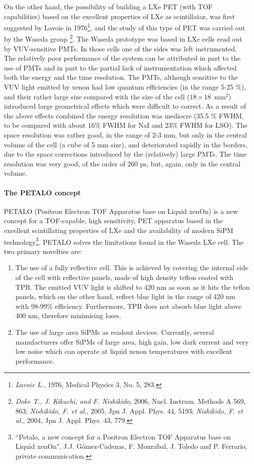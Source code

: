 On the other hand, the possibility of building a LXe PET (with TOF capabilities) based on the excellent properties of LXe as scintillator, was first suggested by Lavoie in 1976\footnote{{\em Lavoie L.}, 1976, Medical Physics 3, No. 5, 283.}, and the study of this type of PET was carried out by the Waseda group \footnote{{\em Doke T., J. Kikuchi, and F. Nishikido}, 2006, 
Nucl. Instrum. Methods A 569, 863;  {\em Nishikido, F. et al.}, 2005, Jpn J. Appl. Phys. 44, 5193; {\em Nishikido, F. et al.}, 2004, Jpn J. Appl. Phys. 43, 779.}. The Waseda prototype was based in LXe cells read out by VUV-sensitive PMTs. In those cells one of the sides was left instrumented. The relatively poor performance of the system can be attributed in part to the use of PMTs and in part to the partial lack of instrumentation which affected both the energy and the time resolution. The PMTs, although sensitive to the VUV light emitted by xenon had low quantum efficiencies (in the range 5-25 \%), and their rather large size compared with the size of the cell ($18\times 18$~mm$^2$) introduced large geometrical effects which were difficult to correct. As a result of the above effects combined the energy resolution was mediocre (35.5 \% FWHM, to be compared with about 16\% FWHM for NaI and 23\% FWHM for LSO). The space resolution was rather good, in the range of 2-3 mm, but only in the central volume of the cell (a cube of 5 mm size), and deteriorated rapidly in the borders, due to the space corrections introduced by the (relatively) large PMTs. The time resolution was very good, of the order of 260 ps, but, again, only in the central volume. 

\paragraph{The PETALO concept}

PETALO (Positron Electron TOF Apparatus base on Liquid xenOn) is a new concept for a TOF-capable, high sensitivity, PET apparatus based in the excellent scintillating properties of LXe and the availability of modern SiPM technology\footnote{``Petalo, a new concept for a Positron Electron TOF Apparatus base on Liquid xenOn", J.J. Gómez-Cadenas, F. Monrabal, J. Toledo and P. Ferrario, private communication. }. PETALO 
solves the limitations found in the Waseda LXe cell. The two primary novelties are:
\begin{enumerate}
\item The use of a fully reflective cell. This is achieved by covering the internal side of the cell with reflective panels, made of high density teflon coated with TPB. The emitted VUV light is shifted to 420 nm as soon as it hits the teflon panels, which on the other hand, reflect blue light in the range of 420 nm with 98-99\% efficiency. Furthermore, TPB does not absorb blue light above 400 nm, therefore minimising loses. 
\item The use of large area SiPMs as readout devices. Currently, several manufacturers offer SiPMs of large area, high gain, low dark current and very low noise which can operate at liquid xenon temperatures with excellent performance.  
\end{enumerate} 

